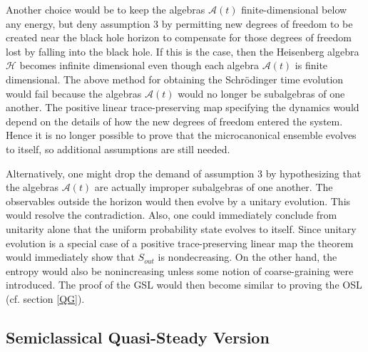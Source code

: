 \documentclass[12pt]{article}
\begin{document}
Another choice would be to keep the algebras $\mathcal{A}(t)$ finite-dimensional below any energy, but deny assumption 3 by permitting new degrees of freedom to be created near the black hole horizon to compensate for those degrees of freedom lost by falling into the black hole.  If this is the case, then the Heisenberg algebra $\mathcal{H}$ becomes infinite dimensional even though each algebra $\mathcal{A}(t)$ is finite dimensional.  The above method for obtaining the Schr\"{o}dinger time evolution would fail because the algebras $\mathcal{A}(t)$ would no longer be subalgebras of one another.  The positive linear trace-preserving map specifying the dynamics would depend on the details of how the new degrees of freedom entered the system.  Hence it is no longer possible to prove that the microcanonical ensemble evolves to itself, so additional assumptions are still needed.

Alternatively, one might drop the demand of assumption 3 by hypothesizing that the algebras $\mathcal{A}(t)$ are actually improper subalgebras of one another.  The observables outside the horizon would then evolve by a unitary evolution.  This would resolve the contradiction.  Also, one could immediately conclude from unitarity alone that the uniform probability state evolves to itself.  Since unitary evolution is a special case of a positive trace-preserving linear map the theorem would immediately show that $S_{out}$ is nondecreasing.  On the other hand, the entropy would also be nonincreasing unless some notion of coarse-graining were introduced.  The proof of the GSL would then become similar to proving the OSL (cf. section \ref{QG}).

\subsection{Semiclassical Quasi-Steady Version}\label{semi}
\end{document}

